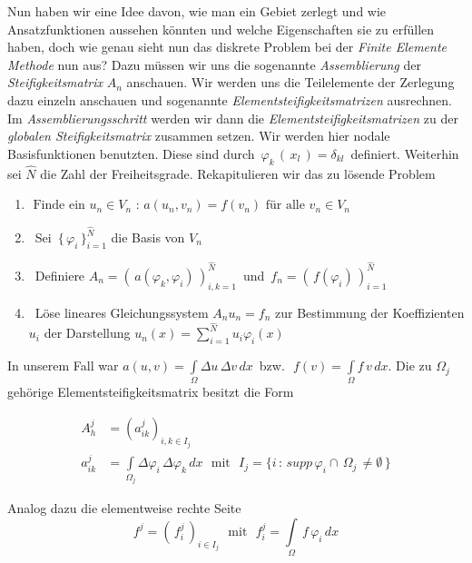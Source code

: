 Nun haben wir eine Idee davon, wie man ein Gebiet zerlegt und wie Ansatzfunktionen aussehen könnten und welche Eigenschaften sie zu erfüllen haben, doch wie genau sieht nun das diskrete Problem bei der \textit{Finite Elemente Methode} nun aus? Dazu müssen wir uns die sogenannte \textit{Assemblierung} der \textit{Steifigkeitsmatrix} $A_n$ anschauen. Wir werden uns die Teilelemente der Zerlegung dazu einzeln anschauen und sogenannte \textit{Elementsteifigkeitsmatrizen} ausrechnen. Im \textit{Assemblierungsschritt} werden wir dann die  \textit{Elementsteifigkeitsmatrizen} zu der \textit{globalen Steifigkeitsmatrix} zusammen setzen.
Wir werden hier nodale Basisfunktionen benutzten. Diese sind durch $\, \varphi_k \, ( \, x_l \, ) = \delta_{kl} \,$ definiert. Weiterhin sei $\hat{N}$ die Zahl der Freiheitsgrade. Rekapitulieren wir das zu lösende Problem

\begin{framed}
\begin{enumerate}
\item $
\text{ Finde ein } u_n \in V_n \text{ : } a(u_n,v_n) = f(v_n) \text{ für alle } v_n \in V_n
$
\item ~Sei $\, \{ \, \varphi_i \, \}_{i=1}^{\hat{N}}$ die Basis  von $V_n$
\item ~Definiere $A_n=( \, a(\varphi_k,\varphi_i) \, )_{i,k=1}^{\hat{N}} \, $ und $ \, f_n=( \, f(\varphi_i) \, )_{i=1}^{\hat{N}}$
\item ~Löse lineares Gleichungssystem $A_n u_n=f_n$ zur Bestimmung der Koeffizienten $u_i$ der Darstellung $u_n(x)=\sum_{i=1}^{\hat{N}} u_i \varphi_i(x)$
\end{enumerate}
\end{framed}

In unserem Fall war $a(u,v)=\int\limits_{\Omega} \Delta u \, \Delta v \, dx \, $ bzw. $\, \, f(v)=\int\limits_{\Omega} f \, v \, dx$. Die zu $\Omega_j$ gehörige Elementsteifigkeitsmatrix besitzt die Form

\begin{equation} \label{eq:element}
\begin{aligned}
A_h^j &= (a_{ik}^j)_{i,k \in I_j} \\
a_{ik}^j &= \int\limits_{\Omega_j} \Delta \varphi_i \, \Delta \varphi_k \, dx \, \, \text{ mit } \, \, 
I_j =\{ i \, : \, supp \, \varphi_i \cap \, \Omega_j \, \neq \emptyset \, \}
\end{aligned}
\end{equation}

Analog dazu die elementweise rechte Seite
\begin{equation*}
f^j = (\, f_i^j \, )_{i \in I_j} \, \, \text{ mit } \, \, f_i^j = \int\limits_{\Omega} \, f \, \varphi_i \, dx 
\end{equation*}

